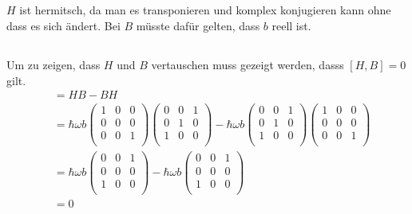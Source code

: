 \subsection{}
$H$ ist hermitsch, da man es transponieren und komplex konjugieren kann ohne dass es sich ändert. Bei $B$ müsste dafür gelten, dass $b$ reell ist.

\subsection{}
Um zu zeigen, dass $H$ und $B$ vertauschen muss gezeigt werden, dasss $[H,B] = 0$ gilt.
\begin{align*}
    [H,B] &= HB-BH \\
          &= \hbar\omega b
    \begin{pmatrix}
        1 &0 &0 \\
        0 &0 &0 \\
        0 &0 &1 \\
    \end{pmatrix}\begin{pmatrix}
        0 &0 &1 \\
        0 &1 &0 \\
        1 &0 &0 \\
    \end{pmatrix} 
    -\hbar\omega b
   \begin{pmatrix}
        0 &0 &1 \\
        0 &1 &0 \\
        1 &0 &0 \\
    \end{pmatrix} \begin{pmatrix}
        1 &0 &0 \\
        0 &0 &0 \\
        0 &0 &1 \\
    \end{pmatrix} \\
    &= \hbar\omega b
    \begin{pmatrix}
        0 &0 &1 \\
        0 &0 &0 \\
        1 &0 &0 \\
    \end{pmatrix} 
    -\hbar\omega b
    \begin{pmatrix}
        0 &0 &1 \\
        0 &0 &0 \\
        1 &0 &0 \\
    \end{pmatrix} \\
    &= 0
\end{align*}

